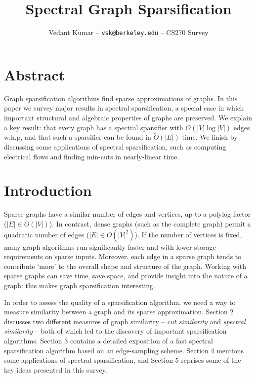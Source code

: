 \documentclass{article}
\title{Spectral Graph Sparsification}
\author{\small{Vedant Kumar -- \texttt{vsk@berkeley.edu} -- CS270 Survey}}
\begin{document}
\maketitle

\newcommand \cut[1]{\text{cut}_{#1}}
\newcommand \textlcsc[1]{\textsc{\MakeLowercase{#1}}}

\section*{Abstract}

Graph sparsification algorithms find sparse approximations of graphs. In
this paper we survey major results in spectral sparsification, a special
case in which important structural and algebraic properties of graphs are
preserved. We explain a key result: that every graph has a spectral
sparsifier with $O(|V|\log|V|)$ edges w.h.p, and that such a sparsifier can
be found in $\tilde{O}(|E|)$ time. We finish by discussing some applications
of spectral sparsification, such as computing electrical flows and finding
min-cuts in nearly-linear time.

\section{Introduction}

Sparse graphs have a similar number of edges and vertices, up to a polylog
factor ($|E| \in \tilde{O}(|V|)$). In contrast, dense graphs (such as the
complete graph) permit a quadratic number of edges ($|E| \in O(|V|^2)$). If
the number of vertices is fixed, many graph algorithms run significantly
faster and with lower storage requirements on sparse inputs.  Moreover, each
edge in a sparse graph tends to contribute `more' to the overall shape and
structure of the graph.  Working with sparse graphs can save time, save
space, and provide insight into the nature of a graph: this makes graph
sparsification interesting.

In order to assess the quality of a sparsification algorithm, we need a way
to measure similarity between a graph and its sparse approximation. Section
2 discusses two different measures of graph similarity --
\textit{cut similarity} and \textit{spectral similarity} -- both of which
led to the discovery of important sparsification algorithms. Section 3
contains a detailed exposition of a fast spectral sparsification algorithm
based on an edge-sampling scheme.  Section 4 mentions some applications of
spectral sparsification, and Section 5 reprises some of the key ideas
presented in this survey.
\end{document}
